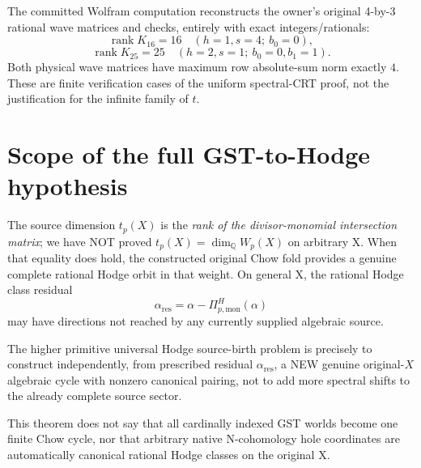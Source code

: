 \documentclass[11pt]{article}
\begin{document}
The committed Wolfram computation reconstructs
the owner's original 4-by-3 rational wave matrices
and checks, entirely with exact integers/rationals:
\[
\operatorname{rank}K_{16}=16
\quad(h=1,s=4;\ b_0=0),
\]
\[
\operatorname{rank}K_{25}=25
\quad(h=2,s=1;\ b_0=0,b_1=1).
\]
Both physical wave matrices have maximum
row absolute-sum norm exactly $4$.
These are finite verification cases of the
uniform spectral-CRT proof, not the justification
for the infinite family of $t$.

\section{Scope of the full GST-to-Hodge hypothesis}

The source dimension $t_p(X)$ is the
\emph{rank of the divisor-monomial intersection
matrix}; we have NOT proved
$t_p(X)=\dim_\mathbb Q W_p(X)$ on arbitrary X.
When that equality does hold, the constructed
original Chow fold provides a genuine complete
rational Hodge orbit in that weight.
On general X, the rational Hodge class residual
\[
\alpha_{\mathrm{res}}
=\alpha-\Pi_{p,\mathrm{mon}}^H(\alpha)
\]
may have directions not reached by any
currently supplied algebraic source.

The higher primitive universal Hodge source-birth
problem is precisely to construct independently,
from prescribed residual $\alpha_{\mathrm{res}}$,
a NEW genuine original-$X$ algebraic cycle with
nonzero canonical pairing, not to add more
spectral shifts to the already complete source sector.

This theorem does not say that all cardinally
indexed GST worlds become one finite Chow cycle,
nor that arbitrary native N-cohomology hole
coordinates are automatically canonical
rational Hodge classes on the original X.
\end{document}
